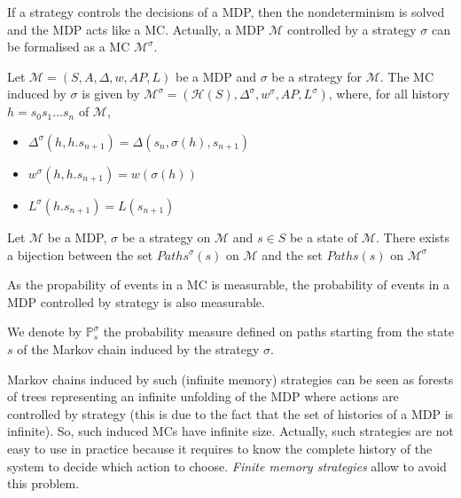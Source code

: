 If a strategy controls the decisions of a MDP, then the nondeterminism is solved
and the MDP acts like a MC. Actually, a MDP $\mathcal{M}$ controlled by a strategy $\sigma$ can be formalised as a MC $\mathcal{M}^\sigma$.

\begin{definition}
Let $\mathcal{M} = (S, A, \Delta, w, AP, L)$ be a MDP and $\sigma$ be a strategy for
$\mathcal{M}$. The MC induced by $\sigma$ is given by
$ \mathcal{M}^\sigma = (\mathcal{H}(S), \Delta^\sigma, w^\sigma, AP, L^\sigma) $, where, for all history
$h = s_0 s_1 \dots s_n$ of $\mathcal{M}$,
\begin{itemize}
\item $\Delta^\sigma(h, h . s_{n+1}) = \Delta(s_n, \sigma(h), s_{n+1})$
\item $w^\sigma(h, h . s_{n+1}) = w(\sigma(h))$
\item $L^\sigma(h . s_{n+1}) = L(s_{n+1})$
\end{itemize}
\end{definition}

\begin{property}
  Let $\mathcal{M}$ be a MDP, $\sigma$ be a strategy on $\mathcal{M}$ and $s\in S$ be a state of $\mathcal{M}$. There exists a bijection between the
  set $Paths^\sigma(s)$ on $\mathcal{M}$ and the set $Paths(s)$ on $\mathcal{M}^\sigma$
\end{property}

As the propability of events in a MC is measurable, the probability of events in a MDP controlled by strategy is also measurable.
\begin{notation}
  We denote by $\mathbb{P}_s^\sigma$ the probability measure defined on paths starting from the state $s$ of the Markov chain induced by the strategy $\sigma$.
\end{notation}

Markov chains induced by such (infinite memory) strategies can be seen as forests of trees representing an infinite unfolding of the MDP where actions are controlled by strategy (this is due to the fact that the set of histories of a MDP is infinite). So, such induced MCs have infinite size. Actually, such strategies are not easy to use in practice because it requires to
know the complete history of the system to decide which action to choose. \textit{Finite memory strategies} allow to avoid this problem.

